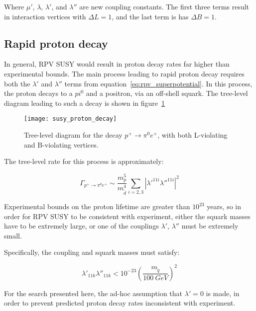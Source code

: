 Where $\mu'$, $\lambda$, $\lambda'$, and $\lambda''$ are new coupling constants.
The first three terms result in interaction vertices with $\Delta L = 1$,
and the last term is has $\Delta B = 1$.

\subsection{Rapid proton decay}\label{subsec:proton_decay}

In general, RPV SUSY would result in proton decay rates far higher than experimental bounds.
The main process leading to rapid proton decay requires both the $\lambda'$ and $\lambda''$ terms from equation~\ref{eq:rpv_superpotential}.
In this process, the proton decays to a $pi^0$ and a positron, via an off-shell squark.
The tree-level diagram leading to such a decay is shown in figure~\ref{fig:susy_proton_decay}

\begin{figure}[!ht]
    \centering
\texttt{[image: susy\_proton\_decay]}
\caption{Tree-level diagram for the decay $p^+ \rightarrow \pi^0 e^+$, with both L-violating and B-violating vertices.}
\label{fig:susy_proton_decay}
\end{figure}\cite{susy-primer-1998}

The tree-level rate for this process is approximately:

\begin{equation}\label{eq:proton_decay_rate}
    \Gamma_{p^+ \rightarrow \pi^0 e^+} \sim \frac{m_p^5}{m_{\tilde{d}}^4} \sum_{i=2,3}\left|\lambda'^{11i}\lambda''^{11i}\right|^2
\end{equation}\cite{susy-primer-1998}

Experimental bounds on the proton lifetime are greater than $10^{23}$ years,
so in order for RPV SUSY to be consistent with experiment,
either the squark masses have to be extremely large, or one of the couplings $\lambda'$, $\lambda''$ must be extremely small.

Specifically, the coupling and squark masses must satisfy:

\begin{equation}\label{eq:rpv_constraint}
    \lambda'_{11k} \lambda''_{11k} < 10^{-23} \left(\frac{m_{\tilde{q}}}{100~GeV}\right)^2
\end{equation}\cite{susy-rpv-constraints}

For the search presented here, the ad-hoc assumption that $\lambda' = 0$ is made, in order to prevent predicted proton
decay rates inconsistent with experiment.

